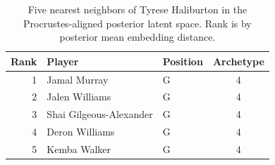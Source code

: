 \begin{table}[htbp]
  \centering\small
  \begin{tabular}{rllc}
    \toprule
    Rank & Player & Position & Archetype \\
    \midrule
    1 & Jamal Murray & G & 4 \\
    2 & Jalen Williams & G & 4 \\
    3 & Shai Gilgeous-Alexander & G & 4 \\
    4 & Deron Williams & G & 4 \\
    5 & Kemba Walker & G & 4 \\
    \bottomrule
  \end{tabular}
  \caption{Five nearest neighbors of Tyrese Haliburton in the Procrustes-aligned posterior latent space. Rank is by posterior mean embedding distance.}
  \label{tab:Tyrese_Haliburton_neighbors}
\end{table}

